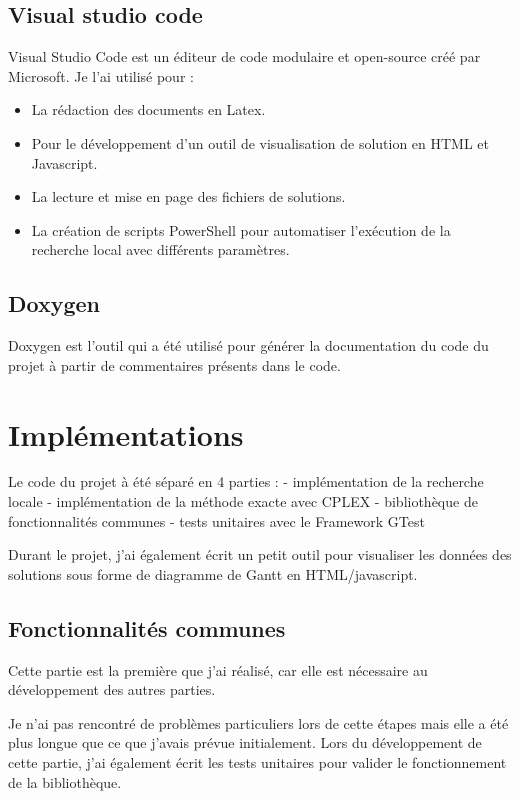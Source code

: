 \subsection{Visual studio code}
Visual Studio Code est un éditeur de code modulaire et open-source créé par Microsoft.
Je l'ai utilisé pour : 
\begin{itemize}
    \item La rédaction des documents en Latex.
    \item Pour le développement d'un outil de visualisation de solution en HTML et Javascript.
    \item La lecture et mise en page des fichiers de solutions.
    \item La création de scripts PowerShell pour automatiser l'exécution de la recherche local avec différents paramètres.
\end{itemize}

\subsection{Doxygen}
Doxygen est l'outil qui a été utilisé pour générer la documentation du code du projet à partir de commentaires présents dans le code.


\section{Implémentations}

Le code du projet à été séparé en 4 parties :
- implémentation de la recherche locale
- implémentation de la méthode exacte avec CPLEX
- bibliothèque de fonctionnalités communes
- tests unitaires avec le Framework GTest

Durant le projet, j'ai également écrit un petit outil pour visualiser les données des solutions sous forme de diagramme de Gantt en HTML/javascript.

\subsection{Fonctionnalités communes}
Cette partie est la première que j'ai réalisé, car elle est nécessaire au développement des autres parties.

Je n'ai pas rencontré de problèmes particuliers lors de cette étapes mais elle a été plus longue que ce que j'avais prévue initialement.
Lors du développement de cette partie, j'ai également écrit les tests unitaires pour valider le fonctionnement de la bibliothèque.

